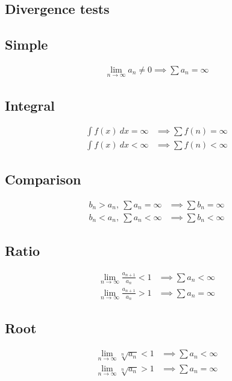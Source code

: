 \documentclass[12pt]{article}
\begin{document}
\begin{multicols}{2}

\section*{Divergence tests}

\subsection*{Simple}
\begin{align*}
    \lim_{n\to\infty} a_n \neq 0 \implies \sum a_n = \infty
\end{align*}

\subsection*{Integral}
\begin{align*}
    \int f(x)\ dx = \infty &\implies \sum f(n) = \infty \\
    \int f(x)\ dx < \infty &\implies \sum f(n) < \infty
\end{align*}

\subsection*{Comparison}
\begin{align*}
    b_n > a_n,\ \sum a_n = \infty &\implies \sum b_n = \infty \\
    b_n < a_n,\ \sum a_n < \infty &\implies \sum b_n < \infty
\end{align*}

\subsection*{Ratio}
\begin{align*}
    \lim_{n\to\infty} \frac{a_{n+1}}{a_n} < 1 &\implies \sum a_n < \infty\\
    \lim_{n\to\infty} \frac{a_{n+1}}{a_n} > 1 &\implies \sum a_n = \infty
\end{align*}

\subsection*{Root}
\begin{align*}
    \lim_{n\to\infty} \sqrt[n]{a_n} < 1 &\implies \sum a_n < \infty \\
    \lim_{n\to\infty} \sqrt[n]{a_n} > 1 &\implies \sum a_n = \infty
\end{align*}


\end{multicols}
\end{document}
